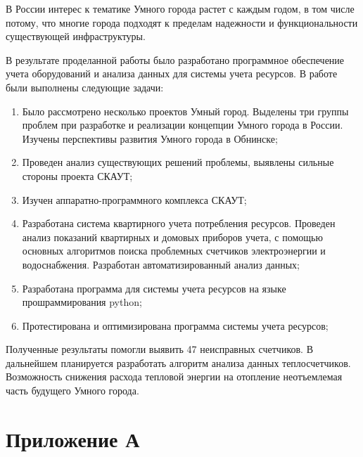 \documentclass[a4paper,12pt]{article}
\begin{document}
В России интерес к тематике Умного города растет с каждым годом, в том числе потому, что многие города подходят к пределам надежности и функциональности существующей инфраструктуры.

В результате проделанной работы было разработано программное обеспечение учета оборудований и анализа данных для системы учета ресурсов.
В работе были выполнены следующие задачи:

\begin{enumerate}
	\item Было рассмотрено несколько проектов Умный город. Выделены три группы проблем при разработке и реализации концепции Умного города в России. Изучены перспективы развития Умного города в Обнинске;
	\item Проведен анализ существующих решений проблемы, выявлены сильные стороны проекта СКАУТ;
	\item Изучен аппаратно-программного комплекса СКАУТ; 
	\item Разработана система квартирного учета потребления ресурсов. Проведен анализ показаний квартирных и домовых приборов учета, с помощью основных алгоритмов поиска проблемных счетчиков электроэнергии и водоснабжения. Разработан автоматизированный анализ данных;
	\item Разработана программа для системы учета ресурсов на языке прошраммирования python;
	\item Протестирована и оптимизирована программа системы учета ресурсов;	
\end{enumerate}

Полученные результаты помогли выявить 47 неисправных счетчиков. В дальнейшем планируется разработать алгоритм анализа данных теплосчетчиков. Возможность снижения расхода тепловой энергии на отопление неотъемлемая часть будущего Умного города.


\pagebreak

\printbibliography

\pagebreak

\section*{ \centering Приложение А} 
\end{document}
